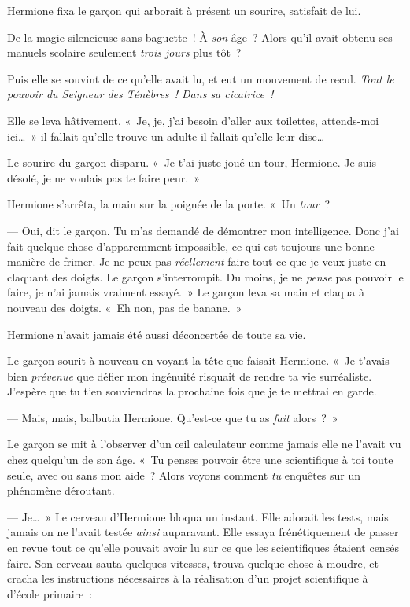 Hermione fixa le garçon qui arborait à présent un sourire, satisfait de lui.

De la magie silencieuse sans baguette~!  À \emph{son} âge~? Alors qu'il avait obtenu ses manuels scolaire seulement \emph{trois jours} plus tôt~?

Puis elle se souvint de ce qu'elle avait lu, et eut un mouvement de recul.
\emph{Tout le pouvoir du Seigneur des Ténèbres~! Dans sa cicatrice~!}

Elle se leva hâtivement. «~Je, je, j'ai besoin d'aller aux toilettes, attends-moi ici…~» il fallait qu'elle trouve un adulte il fallait qu'elle leur dise…

Le sourire du garçon disparu. «~Je t'ai juste joué un tour, Hermione. Je suis désolé, je ne voulais pas te faire peur.~»

Hermione s'arrêta, la main sur la poignée de la porte.  «~Un \emph{tour}~?

--- Oui, dit le garçon.
Tu m'as demandé de démontrer mon intelligence.
Donc j'ai fait quelque chose d'apparemment impossible, ce qui est toujours une bonne manière de frimer.
Je ne peux pas \emph{réellement} faire tout ce que je veux juste en claquant des doigts.
Le garçon s'interrompit.
Du moins, je ne \emph{pense} pas pouvoir le faire, je n'ai jamais vraiment essayé.~»
Le garçon leva sa main et claqua à nouveau des doigts.
«~Eh non, pas de banane.~»

Hermione n'avait jamais été aussi déconcertée de toute sa vie.

Le garçon sourit à nouveau en voyant la tête que faisait Hermione.
«~Je t'avais bien \emph{prévenue} que défier mon ingénuité risquait de rendre ta vie surréaliste.
J'espère que tu t'en souviendras la prochaine fois que je te mettrai en garde.

--- Mais, mais, balbutia Hermione. Qu'est-ce que tu as \emph{fait} alors~?~»

Le garçon se mit à l'observer d'un œil calculateur comme jamais elle ne l'avait vu chez quelqu'un de son âge.
«~Tu penses pouvoir être une scientifique à toi toute seule, avec ou sans mon aide~?
Alors voyons comment \emph{tu} enquêtes sur un phénomène déroutant.

--- Je…~» Le cerveau d'Hermione bloqua un instant.
Elle adorait les tests, mais jamais on ne l'avait testée \emph{ainsi} auparavant.
Elle essaya frénétiquement de passer en revue tout ce qu'elle pouvait avoir lu sur ce que les scientifiques étaient censés faire.
Son cerveau sauta quelques vitesses, trouva quelque chose à moudre, et cracha les instructions nécessaires à la réalisation d'un projet scientifique à d'école primaire~:

